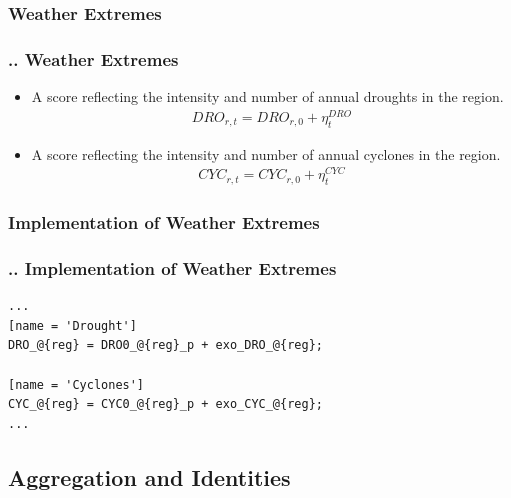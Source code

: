 \documentclass[11pt,aspectratio=169]{beamer}
\begin{document}
\subsubsection{Weather Extremes}
\begin{frame}
\frametitle{{\thesection.\thesubsection.\thesubsubsection} Weather Extremes}
\scriptsize
\begin{itemize}
\item A score reflecting the intensity and number of annual droughts in the region.
\begin{align*}
DRO_{r,t} = DRO_{r,0} + \eta^{DRO}_{t}
\end{align*}
\item A score reflecting the intensity and number of annual cyclones in the region.
\begin{align*}
CYC_{r,t} = CYC_{r,0} + \eta^{CYC}_{t}
\end{align*}
\end{itemize}
\end{frame}

\subsubsection{Implementation of Weather Extremes}
\begin{frame}[fragile]
\frametitle{{\thesection.\thesubsection.\thesubsubsection} Implementation of Weather Extremes}

\begin{lstlisting}[frame = single]
...
[name = 'Drought']
DRO_@{reg} = DRO0_@{reg}_p + exo_DRO_@{reg};

[name = 'Cyclones']
CYC_@{reg} = CYC0_@{reg}_p + exo_CYC_@{reg};
...
\end{lstlisting}
\end{frame}

\subsection{Aggregation and Identities}
\end{document}
